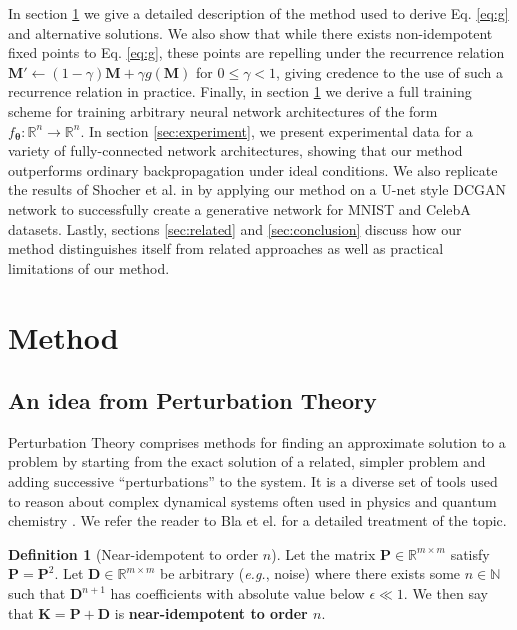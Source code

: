 \documentclass{article}
\theoremstyle{plain}
\theoremstyle{definition}
\newtheorem{definition}[theorem]{Definition}
\theoremstyle{remark}
\newcommand{\vD}{\mathbf{D}}
\newcommand{\vK}{\mathbf{K}}
\newcommand{\vM}{\mathbf{M}}
\newcommand{\vP}{\mathbf{P}}
\newcommand{\vtheta}{\bm{\theta}}
\begin{document}
In section \ref{sec:method} we give a detailed description of the method used to derive Eq. \ref{eq:g} and alternative solutions. We also show that while there exists non-idempotent fixed points to Eq. \ref{eq:g}, these points are repelling under the recurrence relation ${\vM' \leftarrow (1 - \gamma)\vM + \gamma g(\vM)}$ for $0 \leq \gamma < 1$, giving credence to the use of such a recurrence relation in practice. Finally, in section \ref{sec:method} we derive a full training scheme for training arbitrary neural network architectures of the form $f_{\vtheta}: \mathbb{R}^n \to \mathbb{R}^n$. In section \ref{sec:experiment}, we present experimental data for a variety of fully-connected network architectures, showing that our method outperforms ordinary backpropagation under ideal conditions. We also replicate the results of Shocher et al. in \cite{shocher-ign} by applying our method on a U-net style DCGAN network to successfully create a generative network for MNIST and CelebA datasets. Lastly, sections \ref{sec:related} and \ref{sec:conclusion} discuss how our method distinguishes itself from related approaches as well as practical limitations of our method.

\section{Method}
\label{sec:method}

\subsection{An idea from Perturbation Theory}
Perturbation Theory comprises methods for finding an approximate solution to a problem by starting from the exact solution of a related, simpler problem and adding successive ``perturbations'' to the system. It is a diverse set of tools used to reason about complex dynamical systems often used in physics and quantum chemistry \cite{hirschfelder-dev-perturb}. We refer the reader to Bla et el. \cite{intro-pertub-theory} for a detailed treatment of the topic.


\begin{definition}[Near-idempotent to order $n$]
    Let the matrix $\vP \in \mathbb{R}^{m \times m}$ satisfy $\vP = \vP^2$. Let ${\vD \in \mathbb{R}^{m \times m}}$ be arbitrary (\textit{e.g.}, noise) where there exists some $n \in \mathbb{N}$ such that $\vD^{n+1}$ has coefficients with absolute value below $\epsilon \ll 1$. We then say that $\vK = \vP + \vD$ is \textbf{near-idempotent to order $n$}.
    \label{def:near-idem}
\end{definition}
\end{document}
